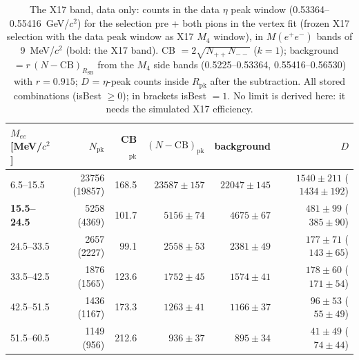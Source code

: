 \begin{table}[H]
\centering\small
\setlength{\tabcolsep}{4pt}
\caption{The X17 band, data only: counts in the data $\eta$ peak window (0.53364--0.55416~GeV/$c^2$) for the selection pre + both pions in the vertex fit (frozen X17 selection with the data peak window as X17 $M_4$ window), in $M(e^+e^-)$ bands of 9~MeV/$c^2$ (bold: the X17 band). CB $=2\sqrt{N_{++}N_{--}}$ ($k=1$); background $=r\,(N-\mathrm{CB})_{R_\mathrm{SB}}$ from the $M_4$ side bands (0.5225--0.53364, 0.55416--0.56530) with $r=0.915$; $D$ = $\eta$-peak counts inside $R_\mathrm{pk}$ after the subtraction. All stored combinations (isBest $\geq0$); in brackets isBest $=1$. No limit is derived here: it needs the simulated X17 efficiency.}
\label{tab:res_x17}
\begin{tabular}{lrrrrr}
\toprule
$M_{ee}$ [MeV/$c^2$] & $N_\mathrm{pk}$ & CB$_\mathrm{pk}$ & $(N-\mathrm{CB})_\mathrm{pk}$ & background & $D$ \\
\midrule
6.5--15.5 & 23756 (19857) & 168.5 & $23587\pm157$ & $22047\pm145$ & $1540\pm211$ ($1434\pm192$) \\
\textbf{15.5--24.5} & 5258 (4369) & 101.7 & $5156\pm74$ & $4675\pm67$ & $481\pm99$ ($385\pm90$) \\
24.5--33.5 & 2657 (2227) & 99.1 & $2558\pm53$ & $2381\pm49$ & $177\pm71$ ($143\pm65$) \\
33.5--42.5 & 1876 (1565) & 123.6 & $1752\pm45$ & $1574\pm41$ & $178\pm60$ ($171\pm54$) \\
42.5--51.5 & 1436 (1167) & 173.3 & $1263\pm41$ & $1166\pm37$ & $96\pm53$ ($55\pm49$) \\
51.5--60.5 & 1149 (956) & 212.6 & $936\pm37$ & $895\pm34$ & $41\pm49$ ($74\pm44$) \\
\bottomrule
\end{tabular}
\end{table}

